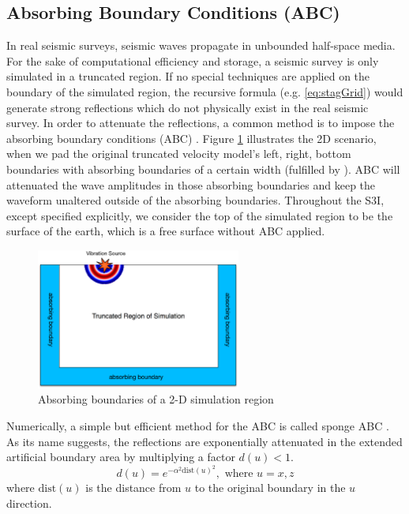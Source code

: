 \documentclass[11pt,titlepage]{article}
\theoremstyle{plain}
\theoremstyle{definition}
\theoremstyle{remark}
\numberwithin{equation}{section}
\begin{document}
\subsection{Absorbing Boundary Conditions (ABC)}
In real seismic surveys, seismic waves propagate in unbounded half-space media. For the sake of computational efficiency and storage, a seismic survey is only simulated in a truncated region. If no special techniques are applied on the boundary of the simulated region, the recursive formula (e.g. \eqref{eq:stagGrid}) would generate strong reflections which do not physically exist in the real seismic survey. In order to attenuate the reflections, a common method is to impose the absorbing boundary conditions (ABC) \cite{Engquist:1977aa, Clayton:1977aa}. Figure \ref{fig:ABC} illustrates the 2D scenario, when we pad the original truncated velocity model's left, right, bottom boundaries with absorbing boundaries of a certain width (fulfilled by ). ABC will attenuated the wave amplitudes in those absorbing boundaries and keep the waveform unaltered outside of the absorbing boundaries. Throughout the S3I, except specified explicitly, we consider the top of the simulated region to be the surface of the earth, which is a free surface without ABC applied.

\begin{figure}[htbp]
\centering
\includegraphics[width=0.6\textwidth]{Fig/ABC}
\caption{Absorbing boundaries of a 2-D simulation region}
\label{fig:ABC}
\end{figure}

Numerically, a simple but efficient method for the ABC is called sponge ABC \cite{Cerjan:1985aa}. As its name suggests, the reflections are exponentially attenuated in the extended artificial boundary area by multiplying a factor $d(u) < 1$.
\begin{equation}
d(u) = e^{-\alpha^2\text{dist}(u)^2}, \mbox{  where  } u=x, z
\end{equation}
where $\text{dist}(u)$ is the distance from $u$ to the original boundary in the $u$ direction. 
\end{document}
